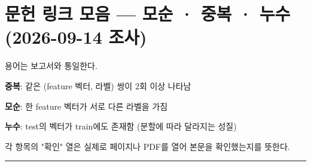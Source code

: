 \section{문헌 링크 모음 — 모순 · 중복 · 누수 (2026-09-14 조사)}
용어는 보고서와 통일한다.

\par\noindent \textbullet\enspace \textbf{중복}: 같은 (feature 벡터, 라벨) 쌍이 2회 이상 나타남


\par\noindent \textbullet\enspace \textbf{모순}: 한 feature 벡터가 서로 다른 라벨을 가짐


\par\noindent \textbullet\enspace \textbf{누수}: test의 벡터가 train에도 존재함 (분할에 따라 달라지는 성질)


각 항목의 "확인" 열은 실제로 페이지나 PDF를 열어 본문을 확인했는지를 뜻한다.


\medskip\hrule\medskip
